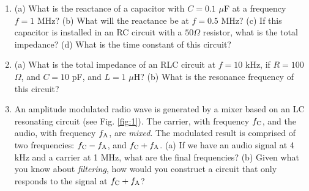 \documentclass{article}
\begin{document}
\begin{enumerate}
\item (a) What is the reactance of a capacitor with $C = 0.1$ $\mu$F at a frequency $f = 1$ MHz? (b) What will the reactance be at $f = 0.5$ MHz? (c) If this capacitor is installed in an RC circuit with a $50\Omega$ resistor, what is the total impedance? (d) What is the time constant of this circuit? \\ \vspace{1.5cm}
\item (a) What is the total impedance of an RLC circuit at $f = 10$ kHz, if $R = 100$ $\Omega$, and $C = 10$ pF, and $L = 1$ $\mu$H? (b) What is the resonance frequency of this circuit? \\ \vspace{1.5cm}
\item An amplitude modulated radio wave is generated by a mixer based on an LC resonating circuit (see Fig. \ref{fig:1}).  The carrier, with frequency $f_{\rm C}$, and the audio, with frequency $f_{\rm A}$, are \textit{mixed}.  The modulated result is comprised of two frequencies: $f_{\rm C} - f_{\rm A}$, and $f_{\rm C} + f_{\rm A}$. (a) If we have an audio signal at 4 kHz and a carrier at 1 MHz, what are the final frequencies? (b) Given what you know about \textit{filtering}, how would you construct a circuit that only responds to the signal at $f_{\rm C} + f_{\rm A}$?
\end{enumerate}
\end{document}
